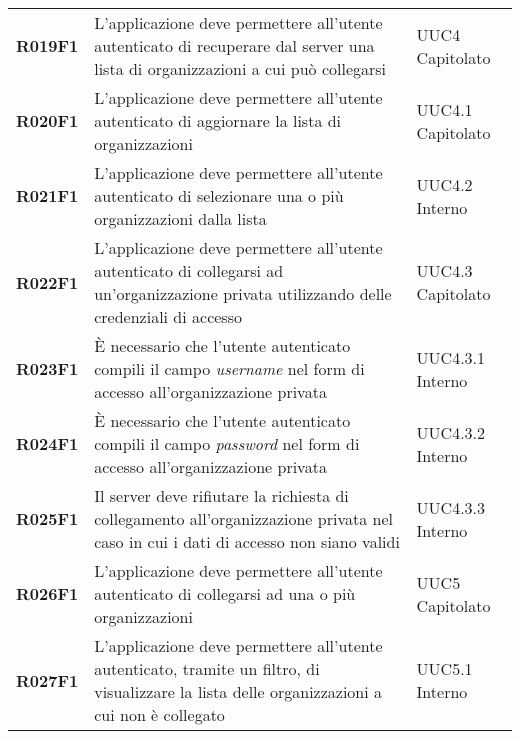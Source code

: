 \documentclass[../analisi-dei-requisiti.tex]{subfiles}
\begin{document}
\begin{center}
\begin{longtable}[H]{>{\centering\bfseries}m{3cm} >{\centering}m{10cm} >{\centering\arraybackslash}m{3cm}}
  R019F1                               & L'applicazione deve permettere all'utente autenticato di recuperare dal server una lista di organizzazioni a cui può collegarsi                                                                         & UUC4 Capitolato               \\
  R020F1                               & L'applicazione deve permettere all'utente autenticato di aggiornare la lista di organizzazioni                                                                                                          & UUC4.1 Capitolato             \\
  R021F1                               & L'applicazione deve permettere all'utente autenticato di selezionare una o più organizzazioni dalla lista                                                                                               & UUC4.2 Interno                \\
  R022F1                               & L'applicazione deve permettere all'utente autenticato di collegarsi ad un'organizzazione privata utilizzando delle credenziali di accesso                                                               & UUC4.3 Capitolato             \\
  R023F1                               & È necessario che l'utente autenticato compili il campo \textit{username} nel form di accesso all'organizzazione privata                                                                                 & UUC4.3.1 Interno              \\
  R024F1                               & È necessario che l'utente autenticato compili il campo \textit{password} nel form di accesso all'organizzazione privata                                                                                 & UUC4.3.2 Interno              \\
  R025F1                               & Il server deve rifiutare la richiesta di collegamento all'organizzazione privata nel caso in cui i dati di accesso non siano validi                                                                     & UUC4.3.3 Interno              \\
  R026F1                               & L'applicazione deve permettere all'utente autenticato di collegarsi ad una o più organizzazioni                                                                                                         & UUC5 Capitolato               \\
  R027F1                               & L'applicazione deve permettere all'utente autenticato, tramite un filtro, di visualizzare la lista delle organizzazioni a cui non è collegato                                                           & UUC5.1 Interno                \\

\end{longtable}
\end{center}
\end{document}
